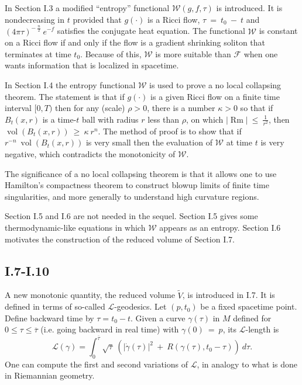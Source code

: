 \documentclass[12pt]{amsart}
\newcommand{\Rm}{\operatorname{Rm}}
\newcommand{\vol}{\operatorname{vol}}
\numberwithin{equation}{section}
\theoremstyle{plain}
\theoremstyle{definition}
\theoremstyle{remark}
\begin{document}
In Section I.3 a modified ``entropy'' functional ${\mathcal W}(g,f,\tau)$ is
introduced.  It is nondecreasing in $t$ provided that $g(\cdot)$ is a Ricci flow,
$\tau \: = \: t_0 \: - \: t$ and $(4 \pi \tau)^{- \: \frac{n}{2}} \:
e^{-f}$ satisfies the conjugate heat equation. The functional
${\mathcal W}$ is constant on a Ricci flow if and only if the flow is a gradient
shrinking soliton that terminates at time $t_0$. Because of this,
${\mathcal W}$ is more suitable than ${\mathcal F}$ when one wants
information that is localized in spacetime.

In Section I.4 the entropy functional ${\mathcal W}$ is used to prove
a no local collapsing theorem. The statement is that if $g(\cdot)$ is a given
Ricci flow on a finite time interval $[0, T)$ then for any (scale) $\rho > 0$,
there is a number $\kappa > 0$ so that if $B_t(x,r)$ is a time-$t$ ball
with radius $r$ less than $\rho$, on which $|\Rm| \: \le \: \frac{1}{r^2}$, 
then $\vol(B_t(x,r)) \: \ge \:
\kappa \: r^n$. The method of proof is to show that if 
$r^{-n} \: \vol(B_t(x,r))$ is very small then the evaluation of ${\mathcal W}$
at time $t$ is very negative, which contradicts the monotonicity of
${\mathcal W}$.

The significance of a no local collapsing theorem is that it allows one to 
use Hamilton's compactness theorem to construct blowup limits of finite time
singularities, and more generally to understand high curvature regions.

Section I.5 and I.6 are not needed in the sequel.  Section I.5 gives some
thermodynamic-like equations in which ${\mathcal W}$
appears as an entropy.  Section I.6 motivates the construction of the
reduced volume of Section I.7. 

\subsection{I.7-I.10}

A new monotonic quantity, the reduced volume $\tilde{V}$, 
is introduced in I.7.  It is defined in terms of so-called
${\mathcal L}$-geodesics. Let $(p, t_0)$ be a fixed spacetime point.
Define backward time by $\tau = t_0 -t$. Given a curve
$\gamma(\tau)$ in $M$ defined for $0 \le \tau \le \overline{\tau}$ (i.e.
going backward in real time) with $\gamma(0) \: = \: p$, its
${\mathcal L}$-length is 
\begin{equation}
{\mathcal L}(\gamma) = \int_0^{\overline{\tau}} \sqrt{\tau} \:
\left( |\dot{\gamma}(\tau)|^2 \: + \: R(\gamma(\tau),t_0 - \tau) \right)
\: d\tau.
\end{equation}
One can compute the first and second variations of ${\mathcal L}$, in
analogy to what is done in Riemannian geometry.  
\end{document}
